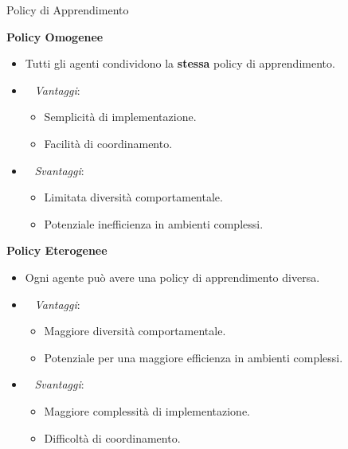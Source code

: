 \documentclass[presentation, 10pt,aspectratio=169]{beamer}\mode<presentation>{\usetheme{AMSBolognaFC}}
\begin{document}
\begin{frame}{Policy di Apprendimento}
	\begin{minipage}{0.45\textwidth}
		\centering
		\alert{\textbf{Policy Omogenee}}
		\begin{itemize}
			\item Tutti gli agenti condividono la \textbf{stessa} policy di apprendimento.
			\item {\color{green}\faThumbsUp} ~ \emph{Vantaggi}:
			\begin{itemize}
				\item Semplicità di implementazione.
				\item Facilità di coordinamento.
			\end{itemize}
			\item {\color{red}\faThumbsDown} ~ \emph{Svantaggi}:
			\begin{itemize}
				\item Limitata diversità comportamentale.
				\item Potenziale inefficienza in ambienti complessi.
			\end{itemize}
		\end{itemize}
	\end{minipage}
	\hfill
	\begin{minipage}{0.45\textwidth}
		\centering
		\textbf{Policy Eterogenee}
		\begin{itemize}
			\item Ogni agente può avere una policy di apprendimento diversa.
			\item {\color{green}\faThumbsUp} ~ \emph{Vantaggi}:
			\begin{itemize}
				\item Maggiore diversità comportamentale.
				\item Potenziale per una maggiore efficienza in ambienti complessi.
			\end{itemize}
			\item {\color{red}\faThumbsDown} ~ \emph{Svantaggi}:
			\begin{itemize}
				\item Maggiore complessità di implementazione.
				\item Difficoltà di coordinamento.
			\end{itemize}
		\end{itemize}
	\end{minipage}
\end{frame}
\end{document}
